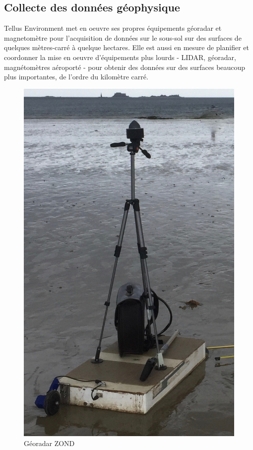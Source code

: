 \documentclass[12pt,a4paper]{report}
\begin{document}
	\subsection{Collecte des données géophysique}
	
	\para Tellus Environment met en oeuvre ses propres équipements géoradar et magnetomètre pour l'acquisition de données sur le sous-sol sur des surfaces de quelques mètres-carré à quelque hectares. Elle est aussi en mesure de planifier et coordonner la mise en oeuvre d'équipements plus lourds - LIDAR, géoradar, magnétomètres aéroporté - pour obtenir des données sur des surfaces beaucoup plus importantes, de l'ordre du kilomètre carré.
	
	\begin{figure}
		\centering
		
		\begin{minipage}{.5\textwidth}
			\centering
			\includegraphics[width=0.7\linewidth]{img/IMG_0332}
			\caption[Géoradar]{Géoradar ZOND}
			\label{fig:georadar}
		\end{minipage}%
		\begin{minipage}{.5\textwidth}
				\centering

\end{minipage}
\end{figure}
\end{document}
